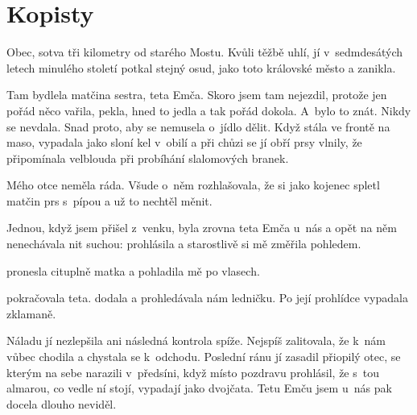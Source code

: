 
\chapter{Kopisty}

Obec, sotva tři kilometry od starého Mostu. Kvůli těžbě uhlí, jí v~sedmdesátých
letech minulého století potkal stejný osud, jako toto královské město a
zanikla.

Tam bydlela matčina sestra, teta Emča. Skoro jsem tam nejezdil, protože jen
pořád něco vařila, pekla, hned to jedla a tak pořád dokola. A~bylo to znát.
Nikdy se nevdala. Snad proto, aby se nemusela o~jídlo dělit. Když stála ve
frontě na maso, vypadala jako sloní kel v~obilí a při chůzi se jí obří prsy
vlnily, že připomínala velblouda při probíhání slalomových branek.

Mého otce neměla ráda. Všude o~něm rozhlašovala, že si jako kojenec spletl
matčin prs s~pípou a už to nechtěl měnit.

Jednou, když jsem přišel z~venku, byla zrovna teta Emča u~nás a opět na něm
nenechávala nit suchou:  prohlásila a starostlivě si
mě změřila pohledem.

 pronesla cituplně matka a
pohladila mě po vlasech.

 pokračovala teta.
 dodala a prohledávala nám ledničku. Po její prohlídce
vypadala zklamaně.

Náladu jí nezlepšila ani následná kontrola spíže. Nejspíš zalitovala, že k~nám
vůbec chodila a chystala se k~odchodu. Poslední ránu jí zasadil přiopilý otec,
se kterým na sebe narazili v~předsíni, když místo pozdravu prohlásil, že s~tou
almarou, co vedle ní stojí, vypadají jako dvojčata. Tetu Emču jsem u~nás pak
docela dlouho neviděl.

